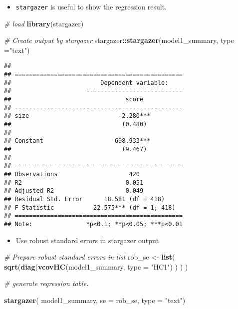 \documentclass[]{book}
\newenvironment{Shaded}{\begin{snugshade}}{\end{snugshade}}
\newcommand{\CommentTok}[1]{\textcolor[rgb]{0.56,0.35,0.01}{\textit{#1}}}
\newcommand{\DataTypeTok}[1]{\textcolor[rgb]{0.13,0.29,0.53}{#1}}
\newcommand{\KeywordTok}[1]{\textcolor[rgb]{0.13,0.29,0.53}{\textbf{#1}}}
\newcommand{\NormalTok}[1]{#1}
\newcommand{\OperatorTok}[1]{\textcolor[rgb]{0.81,0.36,0.00}{\textbf{#1}}}
\newcommand{\StringTok}[1]{\textcolor[rgb]{0.31,0.60,0.02}{#1}}
\providecommand{\tightlist}{%
  \setlength{\itemsep}{0pt}\setlength{\parskip}{0pt}}
\begin{document}
\begin{itemize}
\tightlist
\item
  \texttt{stargazer} is useful to show the regression result.
\end{itemize}

\begin{Shaded}
\begin{Highlighting}[]
\CommentTok{# load}
\KeywordTok{library}\NormalTok{(stargazer)}

\CommentTok{# Create output by stargazer}
\NormalTok{stargazer}\OperatorTok{::}\KeywordTok{stargazer}\NormalTok{(model1_summary, }\DataTypeTok{type =}\StringTok{"text"}\NormalTok{)}
\end{Highlighting}
\end{Shaded}

\begin{verbatim}
## 
## ===============================================
##                         Dependent variable:    
##                     ---------------------------
##                                score           
## -----------------------------------------------
## size                         -2.280***         
##                               (0.480)          
##                                                
## Constant                    698.933***         
##                               (9.467)          
##                                                
## -----------------------------------------------
## Observations                    420            
## R2                             0.051           
## Adjusted R2                    0.049           
## Residual Std. Error      18.581 (df = 418)     
## F Statistic           22.575*** (df = 1; 418)  
## ===============================================
## Note:               *p<0.1; **p<0.05; ***p<0.01
\end{verbatim}

\begin{itemize}
\tightlist
\item
  Use robust standard errors in stargazer output
\end{itemize}

\begin{Shaded}
\begin{Highlighting}[]
\CommentTok{# Prepare robust standard errors in list}
\NormalTok{rob_se <-}\StringTok{ }\KeywordTok{list}\NormalTok{( }\KeywordTok{sqrt}\NormalTok{(}\KeywordTok{diag}\NormalTok{(}\KeywordTok{vcovHC}\NormalTok{(model1_summary, }\DataTypeTok{type =} \StringTok{"HC1"}\NormalTok{) ) ) ) }

\CommentTok{# generate regression table. }

\KeywordTok{stargazer}\NormalTok{( model1_summary, }
           \DataTypeTok{se =}\NormalTok{ rob_se, }
           \DataTypeTok{type =} \StringTok{"text"}\NormalTok{)}
\end{Highlighting}
\end{Shaded}
\end{document}
